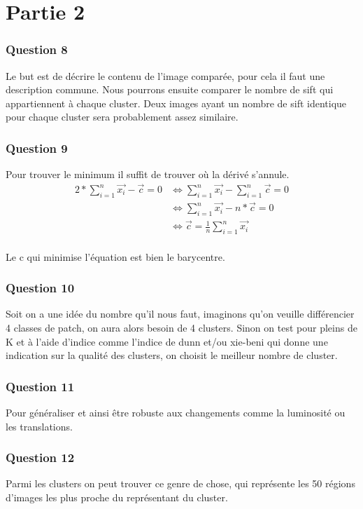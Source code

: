 \documentclass[11pt]{article}
\begin{document}
\part*{\Large Partie 2}
\section*{\large Question 8}
Le but est de décrire le contenu de l’image comparée, pour cela il faut une description commune. Nous pourrons ensuite comparer le nombre de sift qui appartiennent à chaque cluster. Deux images ayant un nombre de sift identique pour chaque cluster sera probablement assez similaire.

\section*{\large Question 9}
Pour trouver le minimum il suffit de trouver où la dérivé s'annule. \\
\begin{align*}
2*\sum_{i=1}^{n} \vec{x_i}-\vec{c} = 0 &\iff \sum_{i=1}^{n} \vec{x_i} - \sum_{i=1}^{n} \vec{c} = 0 \\
&\iff \sum_{i=1}^{n}\vec{x_i} - n*\vec{c} = 0\\
&\iff \vec{c} = \frac{1}{n}\sum_{i=1}^{n} \vec{x_i}
\end{align*}
\\
Le c qui minimise l'équation est bien le barycentre.

\section*{\large Question 10}
Soit on a une idée du nombre qu'il nous faut, imaginons qu’on veuille différencier 4 classes de patch, on aura alors besoin de 4 clusters. Sinon on test pour pleins de K et à l'aide d’indice comme l’indice de dunn et/ou xie-beni qui donne une indication sur la qualité des clusters, on choisit le meilleur nombre de cluster.

\section*{\large Question 11}
Pour généraliser et ainsi être robuste aux changements comme la luminosité ou les translations. 

\section*{\large Question 12}
Parmi les clusters on peut trouver ce genre de chose, qui représente les 50 régions d'images les plus proche du représentant du cluster.
\end{document}
